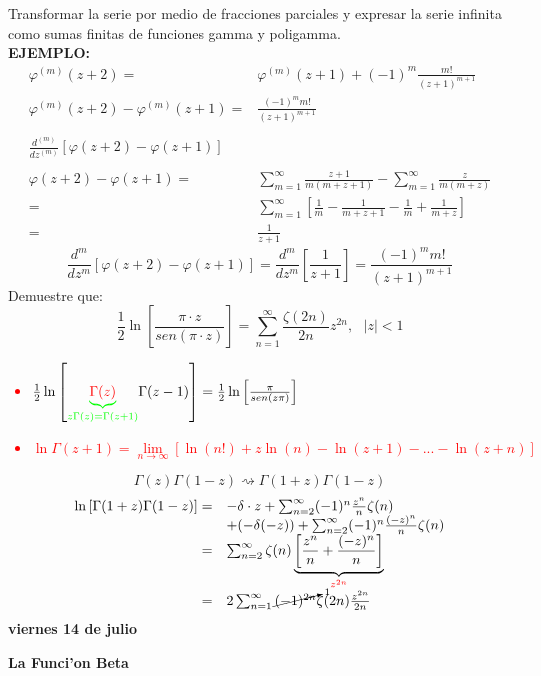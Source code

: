 \documentclass{article}
\theoremstyle{definition}
\begin{document}
Transformar la serie por medio de fracciones parciales y expresar la serie infinita como sumas finitas de funciones gamma y poligamma.\\
\textbf{EJEMPLO: }
\[
\begin{array}{rl}
	\varphi ^{(m)} (z+2)=& \varphi^{(m)} (z+1)+(-1)^{m}\frac{m!}{(z+1)^{m+1}}\\
	\varphi^{(m)} (z+2)-\varphi^{(m)} (z+1)=& \frac{(-1)^mm!}{(z+1)^{m+1}}\\
	\\
	\frac{d^{(m)}}{dz^{(m)}}\left[\varphi (z+2) -\varphi (z+1)\right]\\
	\\
	\varphi (z+2) - \varphi (z+1)=&\sum^{\infty}_{m=1}\frac{z+1}{m(m+z+1)}-\sum^{\infty}_{m=1}\frac{z}{m(m+z)}\\
	=& \sum^{\infty}_{m=1}\left[\frac{1}{m}-\frac{1}{m+z+1}-\frac{1}{m}+\frac{1}{m+z}\right]\\
	=& \frac{1}{z+1}
\end{array}
\]
\[\frac{d^m}{dz^m}\left[\varphi (z+2)-\varphi (z+1)\right] = \frac{d^m}{dz^m}\left[\frac{1}{z+1}\right]=\frac{(-1)^mm!}{(z+1)^{m+1}}\]
Demuestre  que:
\[\frac{1}{2}\ln \left[\frac{\pi\cdot z}{sen(\pi\cdot z)}\right]=\sum^{\infty}_{n=1}\frac{\zeta (2n)}{2n}z^{2n},\ \ \ |z|<1\]
\textcolor{red}{
\begin{itemize}
	\item $\frac{1}{2}\ln\left[\textcolor{green}{\underbrace{\textcolor{red}{\Gamma (z)}}_{z\Gamma (z)=\Gamma (z+1)}}\Gamma (z-1)\right]=\frac{1}{2}\ln\left[\frac{\pi}{sen(z\pi)}\right]$
	\item $\ln \Gamma (z+1) =\lim\limits_{n\to \infty}\left[\ln (n!)+z\ln (n)-\ln (z+1)-...-\ln (z+n)\right]$
\end{itemize}
}
\[\Gamma (z)\Gamma (1-z)\rightsquigarrow\Gamma (1+z)\Gamma (1-z)\]
\[
\begin{array}{rl}
	\ln\left[\Gamma (1+z)\Gamma (1-z)\right]=& -\delta\cdot z +\sum^{\infty}_{n=2}(-1)^n\frac{z^n}{n}\zeta (n)\\
	&+(-\delta(-z))+\sum^{\infty}_{n=2}(-1)^n\frac{(-z)^n}{n}\zeta (n)\\
	=&\sum^{\infty}_{n=2}\zeta (n)\underbrace{\left[\frac{z^n}{n}+\frac{(-z)^n}{n}\right]}_{\textcolor{red}{z^{2n}}}\\
	=& 2\sum^{\infty}_{n=1}\cancelto{1}{(-1)^{2n}}\zeta (2n)\frac{z^{2n}}{2n}
\end{array}
\]
\newpage
\textbf{viernes 14 de julio}

\textbf{La Funci'on Beta}
\end{document}
